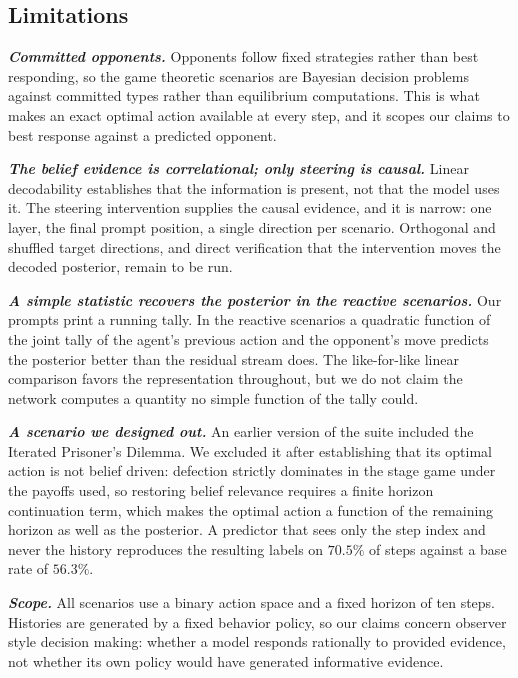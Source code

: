 \subsection{Limitations}

\textbf{\textit{Committed opponents.}}
Opponents follow fixed strategies rather than best responding, so the game
theoretic scenarios are Bayesian decision problems against committed types
rather than equilibrium computations. This is what makes an exact optimal
action available at every step, and it scopes our claims to best response
against a predicted opponent.

\textbf{\textit{The belief evidence is correlational; only steering is causal.}}
Linear decodability establishes that the information is present, not that the
model uses it. The steering intervention supplies the causal evidence, and it
is narrow: one layer, the final prompt position, a single direction per
scenario. Orthogonal and shuffled target directions, and direct verification
that the intervention moves the decoded posterior, remain to be run.

\textbf{\textit{A simple statistic recovers the posterior in the reactive
scenarios.}}
Our prompts print a running tally. In the reactive scenarios a quadratic
function of the joint tally of the agent's previous action and the opponent's
move predicts the posterior better than the residual stream does. The
like-for-like linear comparison favors the representation throughout, but we
do not claim the network computes a quantity no simple function of the tally
could.

\textbf{\textit{A scenario we designed out.}}
An earlier version of the suite included the Iterated Prisoner's Dilemma. We
excluded it after establishing that its optimal action is not belief driven:
defection strictly dominates in the stage game under the payoffs used, so
restoring belief relevance requires a finite horizon continuation term, which
makes the optimal action a function of the remaining horizon as well as the
posterior. A predictor that sees only the step index and never the history
reproduces the resulting labels on \(70.5\%\) of steps against a base rate of
\(56.3\%\).

\textbf{\textit{Scope.}}
All scenarios use a binary action space and a fixed horizon of ten steps.
Histories are generated by a fixed behavior policy, so our claims concern
observer style decision making: whether a model responds rationally to
provided evidence, not whether its own policy would have generated
informative evidence.
